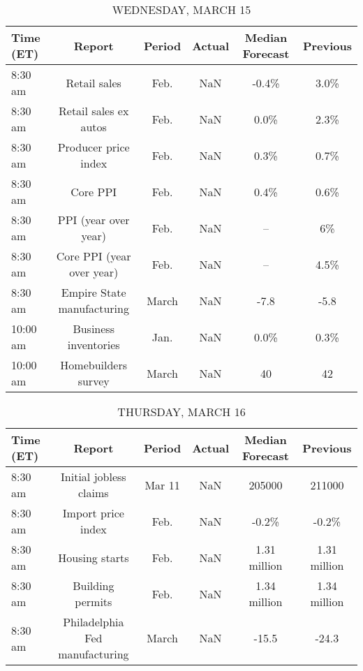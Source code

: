 \documentclass{article}%
\begin{document}
\begin{table}[htbp]%
\caption{WEDNESDAY, MARCH 15}%
\centering%
\begin{adjustbox}{width=1\textwidth}%
\begin{tabular}{lccccc}
\toprule
Time (ET) &                     Report & Period & Actual & Median Forecast & Previous \\
\midrule
  8:30 am &               Retail sales &   Feb. &    NaN &           -0.4\% &     3.0\% \\
  8:30 am &      Retail sales ex autos &   Feb. &    NaN &            0.0\% &     2.3\% \\
  8:30 am &       Producer price index &   Feb. &    NaN &            0.3\% &     0.7\% \\
  8:30 am &                   Core PPI &   Feb. &    NaN &            0.4\% &     0.6\% \\
  8:30 am &       PPI (year over year) &   Feb. &    NaN &              -- &       6\% \\
  8:30 am &  Core PPI (year over year) &   Feb. &    NaN &              -- &     4.5\% \\
  8:30 am & Empire State manufacturing &  March &    NaN &            -7.8 &     -5.8 \\
 10:00 am &       Business inventories &   Jan. &    NaN &            0.0\% &     0.3\% \\
 10:00 am &        Homebuilders survey &  March &    NaN &              40 &       42 \\
\bottomrule
\end{tabular}
%
\end{adjustbox}%
\end{table}

%


\begin{table}[htbp]%
\caption{THURSDAY, MARCH 16}%
\centering%
\begin{adjustbox}{width=1\textwidth}%
\begin{tabular}{lccccc}
\toprule
Time (ET) &                         Report & Period & Actual & Median Forecast &     Previous \\
\midrule
  8:30 am &         Initial jobless claims & Mar 11 &    NaN &          205000 &       211000 \\
  8:30 am &             Import price index &   Feb. &    NaN &           -0.2\% &        -0.2\% \\
  8:30 am &                 Housing starts &   Feb. &    NaN &    1.31 million & 1.31 million \\
  8:30 am &               Building permits &   Feb. &    NaN &    1.34 million & 1.34 million \\
  8:30 am & Philadelphia Fed manufacturing &  March &    NaN &           -15.5 &        -24.3 \\
\bottomrule
\end{tabular}
%
\end{adjustbox}%
\end{table}
\end{document}

